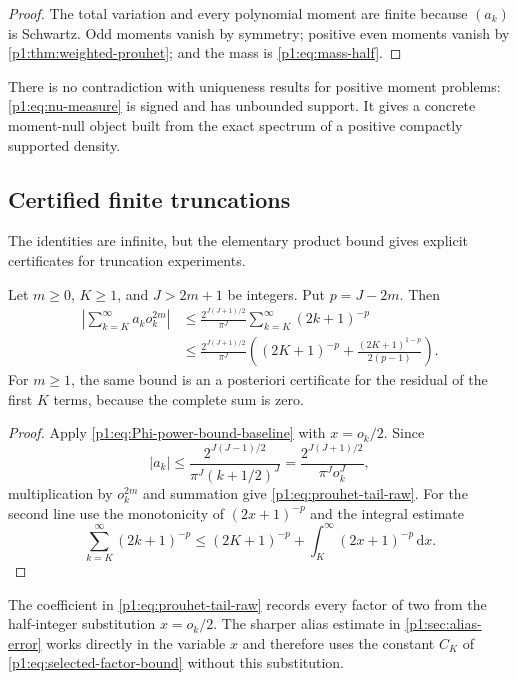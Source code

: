 \documentclass[11pt,oneside]{article}
\theoremstyle{definition}
\theoremstyle{remark}
\newcommand{\dd}{\,\mathrm d}
\begin{document}
\begin{proof}
The total variation and every polynomial moment are finite because $(a_k)$ is
Schwartz.  Odd moments vanish by symmetry; positive even moments vanish by
\cref{p1:thm:weighted-prouhet}; and the mass is \eqref{p1:eq:mass-half}.
\end{proof}

\begin{remark}
There is no contradiction with uniqueness results for positive moment problems:
\eqref{p1:eq:nu-measure} is signed and has unbounded support.  It gives a concrete
moment-null object built from the exact spectrum of a positive compactly
supported density.
\end{remark}

\subsection{Certified finite truncations}

The identities are infinite, but the elementary product bound gives explicit
certificates for truncation experiments.

\begin{proposition}\label{p1:prop:prouhet-tail}
Let $m\ge0$, $K\ge1$, and $J>2m+1$ be integers.  Put $p=J-2m$.  Then
\begin{align}
 \left|\sum_{k=K}^{\infty}a_ko_k^{2m}\right|
 &\le \frac{2^{J(J+1)/2}}{\pi^J}
 \sum_{k=K}^{\infty}(2k+1)^{-p}
 \label{p1:eq:prouhet-tail-raw}\\
 &\le \frac{2^{J(J+1)/2}}{\pi^J}
 \left((2K+1)^{-p}
 +\frac{(2K+1)^{1-p}}{2(p-1)}\right).
 \label{p1:eq:prouhet-tail-explicit}
\end{align}
For $m\ge1$, the same bound is an a posteriori certificate for the residual of
the first $K$ terms, because the complete sum is zero.
\end{proposition}

\begin{proof}
Apply \eqref{p1:eq:Phi-power-bound-baseline} with $x=o_k/2$.  Since
\[
 |a_k|\le
 \frac{2^{J(J-1)/2}}{\pi^J(k+1/2)^J}
 =\frac{2^{J(J+1)/2}}{\pi^Jo_k^J},
\]
multiplication by $o_k^{2m}$ and summation give
\eqref{p1:eq:prouhet-tail-raw}.  For the second line use the monotonicity of
$(2x+1)^{-p}$ and the integral estimate
\[
 \sum_{k=K}^{\infty}(2k+1)^{-p}
 \le (2K+1)^{-p}+\int_K^\infty(2x+1)^{-p}\dd x.
\]
\end{proof}

\begin{remark}
The coefficient in \eqref{p1:eq:prouhet-tail-raw} records every factor of two from
the half-integer substitution $x=o_k/2$.  The sharper alias estimate in
\cref{p1:sec:alias-error} works directly in the variable $x$ and therefore uses the
constant $C_K$ of \eqref{p1:eq:selected-factor-bound} without this substitution.
\end{remark}
\end{document}
